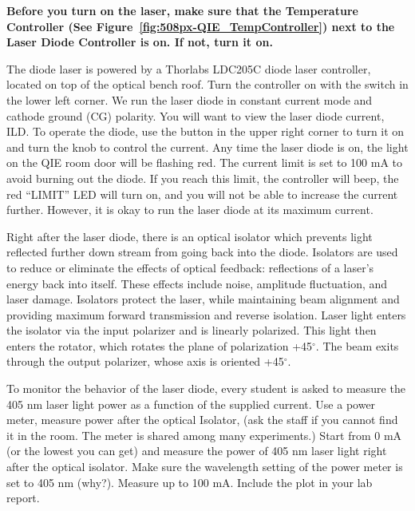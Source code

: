 \documentclass{../lab}
\begin{document}
\textbf{Before you turn on the laser, make sure that the Temperature Controller (See Figure~\ref{fig:508px-QIE_TempController}) next to the Laser Diode Controller is on. If not, turn it on.}

The diode laser is powered by a Thorlabs LDC205C diode laser controller, located on top of the optical bench roof. Turn the controller on with the switch in the lower left corner. We run the laser diode in constant current mode and cathode ground (CG) polarity. You will want to view the laser diode current, ILD. To operate the diode, use the button in the upper right corner to turn it on and turn the knob to control the current. Any time the laser diode is on, the light on the QIE room door will be flashing red. The current limit is set to 100 mA to avoid burning out the diode. If you reach this limit, the controller will beep, the red ``LIMIT'' LED will turn on, and you will not be able to increase the current further. However, it is okay to run the laser diode at its maximum current.

Right after the laser diode, there is an optical isolator which prevents light reflected further down stream from going back into the diode. Isolators are used to reduce or eliminate the effects of optical feedback: reflections of a laser’s energy back into itself. These effects include noise, amplitude fluctuation, and laser damage. Isolators protect the laser, while maintaining beam alignment and providing maximum forward transmission and reverse isolation. Laser light enters the isolator via the input polarizer and is linearly polarized. This light then enters the rotator, which rotates the plane of polarization +45$^\circ$. The beam exits through the output polarizer, whose axis is oriented +45$^\circ$.


To monitor the behavior of the laser diode, every student is asked to measure the 405 nm laser light power as a function of the supplied current. Use a power meter, measure power after the optical Isolator, (ask the staff if you cannot find it in the room. The meter is shared among many experiments.) Start from 0 mA (or the lowest you can get) and measure the power of 405 nm laser light right after the optical isolator. Make sure the wavelength setting of the power meter is set to 405 nm (why?). Measure up to 100 mA. Include the plot in your lab report.
\end{document}
